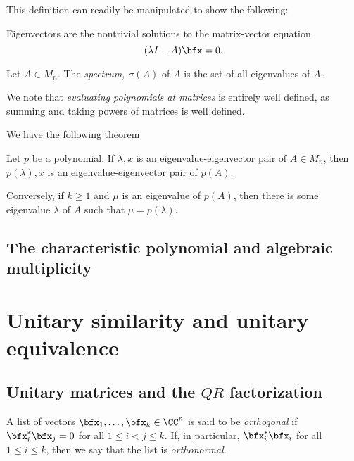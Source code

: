 \documentclass{article}
\begin{document}
This definition can readily be manipulated to show the following:

\begin{proposition}
    Eigenvectors are the nontrivial solutions to the matrix-vector equation
    \[
        (\lambda I-A)\bfx = 0.
    \]
\end{proposition}

\begin{definition}
    Let $A \in M_n$.
    The \textit{spectrum, $\sigma(A)$} of $A$ is the set of all eigenvalues of $A$.
\end{definition}

We note that \textit{evaluating polynomials at matrices} is entirely well defined, as summing and taking powers of matrices is well defined.

We have the following theorem 
\begin{theorem}
    Let $p$ be a polynomial.
    If $\lambda, x$ is an eigenvalue-eigenvector pair of $A \in M_n$, then $p(\lambda),x$ is an eigenvalue-eigenvector pair of $p(A)$.

    Conversely, if $k \geq 1$ and $\mu$ is an eigenvalue of $p(A)$, then there is some eigenvalue $\lambda$ of $A$ such that $\mu = p(\lambda)$.
\end{theorem}

\subsection{The characteristic polynomial and algebraic multiplicity}

\begin{definition}
\end{definition}

\section{Unitary similarity and unitary equivalence}

\subsection{Unitary matrices and the \texorpdfstring{$QR$}{QR} factorization}

\begin{definition}
    A list of vectors $\bfx_1,\ldots,\bfx_k \in \CC^n$ is said to be \textit{orthogonal} if $\bfx_i^\ast \bfx_j = 0$ for all $1 \leq i < j \leq k$.
    If, in particular, $\bfx_i^\ast \bfx_i$ for all $1 \leq i \leq k$, then we say that the list is \textit{orthonormal}.
\end{definition}
\end{document}
